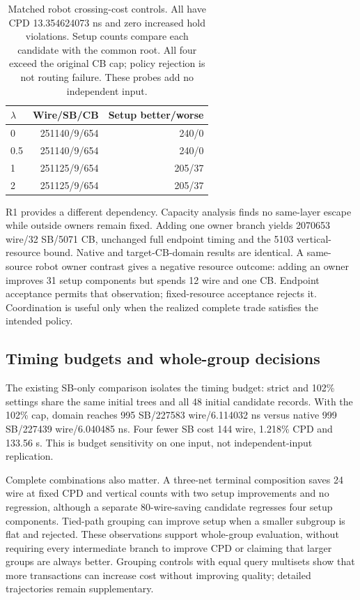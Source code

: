 \documentclass[conference,10pt]{IEEEtran}
\begin{document}
\begin{table}[t]
\centering\footnotesize\setlength{\tabcolsep}{4pt}
\caption{Matched robot crossing-cost controls. All have CPD 13.354624073 ns and zero increased hold violations. Setup counts compare each candidate with the common root. All four exceed the original CB cap; policy rejection is not routing failure. These probes add no independent input.}
\label{tab:costcontrol}
\begin{tabular}{lrr}\hline
$\lambda$ & Wire/SB/CB & Setup better/worse\\\hline
0 & 251140/9/654 & 240/0\\
0.5 & 251140/9/654 & 240/0\\
1 & 251125/9/654 & 205/37\\
2 & 251125/9/654 & 205/37\\\hline
\end{tabular}
\end{table}

R1 provides a different dependency. Capacity analysis finds no same-layer escape while outside owners remain fixed. Adding one owner branch yields 2070653 wire/32 SB/5071 CB, unchanged full endpoint timing and the 5103 vertical-resource bound. Native and target-CB-domain results are identical. A same-source robot owner contrast gives a negative resource outcome: adding an owner improves 31 setup components but spends 12 wire and one CB. Endpoint acceptance permits that observation; fixed-resource acceptance rejects it. Coordination is useful only when the realized complete trade satisfies the intended policy.

\subsection{Timing budgets and whole-group decisions}
The existing SB-only comparison isolates the timing budget: strict and 102\% settings share the same initial trees and all 48 initial candidate records. With the 102\% cap, domain reaches 995 SB/227583 wire/6.114032 ns versus native 999 SB/227439 wire/6.040485 ns. Four fewer SB cost 144 wire, 1.218\% CPD and 133.56 s. This is budget sensitivity on one input, not independent-input replication.

Complete combinations also matter. A three-net terminal composition saves 24 wire at fixed CPD and vertical counts with two setup improvements and no regression, although a separate 80-wire-saving candidate regresses four setup components. Tied-path grouping can improve setup when a smaller subgroup is flat and rejected. These observations support whole-group evaluation, without requiring every intermediate branch to improve CPD or claiming that larger groups are always better. Grouping controls with equal query multisets show that more transactions can increase cost without improving quality; detailed trajectories remain supplementary.
\end{document}
